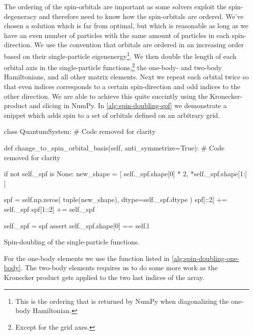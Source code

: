         The ordering of the spin-orbitals are important as some solvers
        exploit the spin-degeneracy and therefore need to know how the
        spin-orbitals are ordered.
        We've chosen a solution which is far from optimal, but which is
        reasonable as long as we have an even number of particles with the same
        amount of particles in each spin-direction.
        We use the convention that orbitals are ordered in an increasing order
        based on their single-particle eigenenergy\footnote{%
            This is the ordering that is returned by NumPy when diagonalizing
            the one-body Hamiltonian.
        }.
        We then double the length of each orbital axis in the single-particle
        functions,\footnote{%
            Except for the grid axes.
        } the one-body- and two-body Hamiltonians, and all other matrix
        elements.
        Next we repeat each orbital twice so that even indices corresponds to a
        certain spin-direction and odd indices to the other direction.
        We are able to achieve this quite succintly using the Kronecker-product
        and slicing in NumPy.
        In \autoref{alg:spin-doubling-spf} we demonstrate a snippet which adds
        spin to a set of orbitals defined on an arbitrary grid.
        \begin{algorithm}
            \begin{python}
class QuantumSystem:
    # Code removed for clarity

    def change_to_spin_orbital_basis(self, anti_symmetrize=True):
        # Code removed for clarity

        if not self._spf is None:
            new_shape = [
                self._spf.shape[0] * 2, *self._spf.shape[1:]
            ]

            spf = self.np.zeros(
                tuple(new_shape), dtype=self._spf.dtype
            )
            spf[::2] += self._spf
            spf[1::2] += self._spf

            self._spf = spf
            assert self._spf.shape[0] == self.l
            \end{python}
            \caption{Spin-doubling of the single-particle functions.}
            \label{alg:spin-doubling-spf}
        \end{algorithm}
        For the one-body elements we use the function listed in
        \autoref{alg:spin-doubling-one-body}.
        The two-body elements requires us to do some more work as the Kronecker
        product gets applied to the two last indices of the array.
